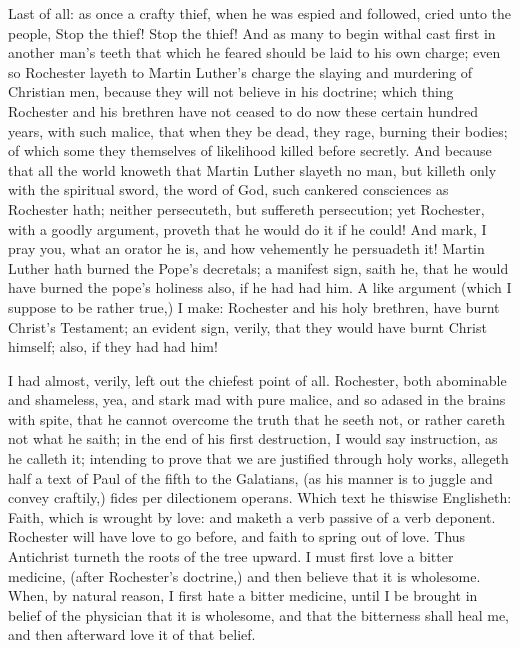 Last of all: as once a crafty thief, when he was espied 
and followed, cried unto the people, Stop the thief! Stop 
the thief! And as many to begin withal cast first in another 
man's teeth that which he feared should be laid to his own 
charge; even so Rochester layeth to Martin Luther's 
charge the slaying and murdering of Christian men, 
because they will not believe in his doctrine; which thing 
Rochester and his brethren have not ceased to do now 
these certain hundred years, with such malice, that when 
they be dead, they rage, burning their bodies; of which 
some they themselves of likelihood killed before secretly. 
And because that all the world knoweth that Martin 
Luther slayeth no man, but killeth only with the spiritual 
sword, the word of God, such cankered consciences as 
Rochester hath; neither persecuteth, but suffereth persecution;
yet Rochester, with a goodly argument, proveth 
that he would do it if he could! And mark, I pray you, 
what an orator he is, and how vehemently he persuadeth 
it! Martin Luther hath burned the Pope's decretals; a 
manifest sign, saith he, that he would have burned the 
pope's holiness also, if he had had him. A like argument
(which I suppose to be rather true,) I make: Rochester
and his holy brethren, have burnt Christ's Testament;
an evident sign, verily, that they would have burnt 
Christ himself; also, if they had had him! 

I had almost, verily, left out the chiefest point of all. 
Rochester, both abominable and shameless, yea, and stark 
mad with pure malice, and so adased in the brains with 
spite, that he cannot overcome the truth that he seeth not, 
or rather careth not what he saith; in the end of his first 
destruction, I would say instruction, as he calleth it; intending
to prove that we are justified through holy works, 
allegeth half a text of Paul of the fifth to the Galatians, 
(as his manner is to juggle and convey craftily,) fides per 
dilectionem operans. Which text he thiswise Englisheth: 
Faith, which is wrought by love: and maketh a verb passive
of a verb deponent. Rochester will have love to go 
before, and faith to spring out of love. Thus Antichrist 
turneth the roots of the tree upward. I must first love a 
bitter medicine, (after Rochester's doctrine,) and then 
believe that it is wholesome. When, by natural reason, I 
first hate a bitter medicine, until I be brought in belief of 
the physician that it is wholesome, and that the bitterness 
shall heal me, and then afterward love it of that belief. 

